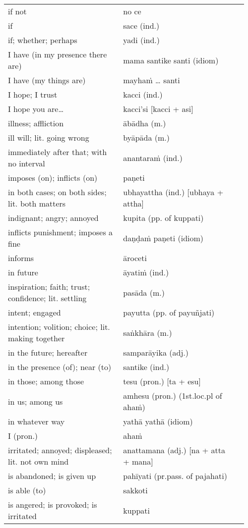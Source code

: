 \documentclass[a5paper]{memoir}
\begin{document}
\begin{longtable}{L{0.48\linewidth} L{0.48\linewidth} H}
if not & no ce & \\
if & sace (ind.) & \\
if; whether; perhaps & yadi (ind.) & \\
I have (in my presence there are) & mama santike santi (idiom) & \\
I have (my things are) & mayhaṁ \ldots{} santi & \\
I hope; I trust & kacci (ind.) & \\
I hope you are\ldots{} & kacci'si [kacci + asi] & \\
illness; affliction & ābādha (m.) & \\
ill will; lit. going wrong & byāpāda (m.) & \\
immediately after that; with no interval & anantaraṁ (ind.) & \\
imposes (on); inflicts (on) & paṇeti & \\
in both cases; on both sides; lit. both matters & ubhayattha (ind.) [ubhaya + attha] & \\
indignant; angry; annoyed & kupita (pp. of kuppati) & \\
inflicts punishment; imposes a fine & daṇḍaṁ paṇeti (idiom) & \\
informs & āroceti & \\
in future & āyatiṁ (ind.) & \\
inspiration; faith; trust; confidence; lit. settling & pasāda (m.) & \\
intent; engaged & payutta (pp. of payuñjati) & \\
intention; volition; choice; lit. making together & saṅkhāra (m.) & \\
in the future; hereafter & samparāyika (adj.) & \\
in the presence (of); near (to) & santike (ind.) & \\
in those; among those & tesu (pron.) [ta + esu] & \\
in us; among us & amhesu (pron.) (1st.loc.pl of ahaṁ) & \\
in whatever way & yathā yathā (idiom) & \\
I (pron.) & ahaṁ & \\
irritated; annoyed; displeased; lit. not own mind & anattamana (adj.) [na + atta + mana] & \\
is abandoned; is given up & pahīyati (pr.pass. of pajahati) & \\
is able (to) & sakkoti & \\
is angered; is provoked; is irritated & kuppati & \\

\end{longtable}
\end{document}
